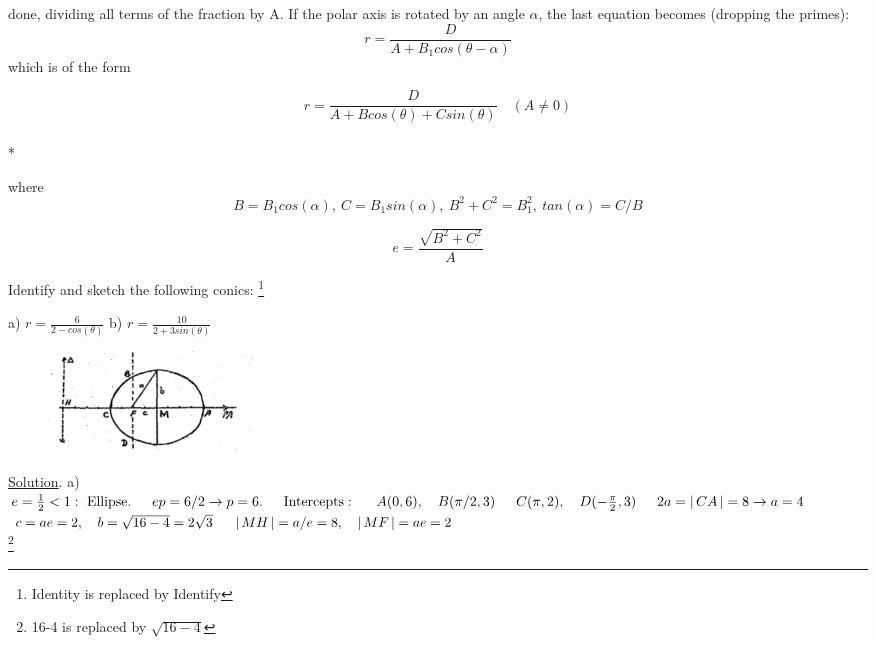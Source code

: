 \documentclass[11pt]{amsbook}
\begin{document}

\noindent done, dividing all terms of the fraction by A.\newline
\indent If the polar axis is rotated by an angle $\alpha$, the last equation 
becomes (dropping the primes):
\[
    r = \frac{D}{A+B_{1}cos(\theta-\alpha)}
\]
which is of the form

\[
    r = \frac{D}{A+Bcos(\theta)+Csin(\theta)} \quad (A \neq 0)
\]\\*

\noindent where \\
\[
B = B_{1}cos(\alpha),\
C=B_{1}sin(\alpha),\
B^{2}+C^{2}=B_{1}^{2},\
tan(\alpha) = C/B
\]

\[
 e = \frac{\sqrt{B^{2}+C^{2}}}{A}
\]
\begin{exmp}
Identify and sketch the following conics: 
\footnote{Identity is replaced by Identify}
\end{exmp}


a) $r= \frac{6}{2-cos(\theta)}$ \tab b) $r  = \frac{10}{2+3sin(\theta)}$ \newline

\begin{figure}
	\includegraphics[width=5.5cm]{images/b1p2-314-fig01}
\end{figure}


\underline{Solution}.
\newline
\newline
\indent a)\ $e = \frac{1}{2}<1:\ \text{Ellipse}.\\
\indent ep = 6/2 \rightarrow p = 6.\\
\indent \text{Intercepts}:\\
\indent A(0, 6),\quad B(\pi/2, 3)\\
\indent C(\pi, 2),\quad D(-\frac{\pi}{2}, 3)\\
\indent 2a = \hAbs{CA} = 8 \rightarrow a=4\\$
\indent$ c=ae=2,\quad b=\sqrt{16-4}=2\sqrt{3}\\
\indent \hAbs{MH}=a/e=8,\quad \hAbs{MF}=ae=2$\\
\footnote{16-4 is replaced by $\sqrt{16-4}$}
\end{document}
